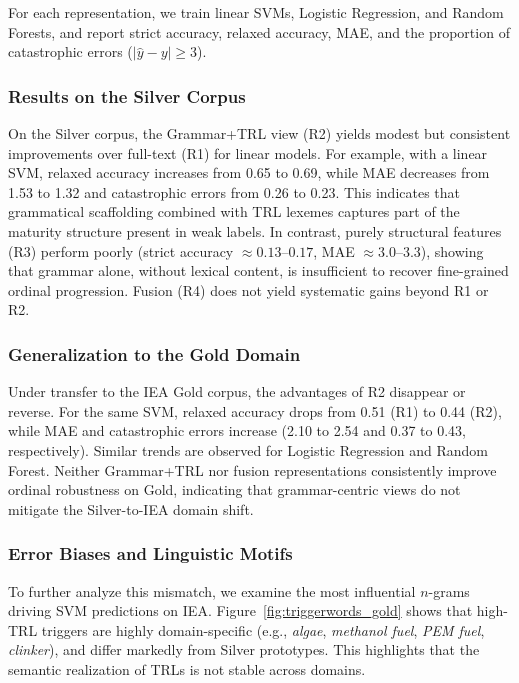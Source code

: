 \documentclass[runningheads]{llncs}
\begin{document}
For each representation, we train linear SVMs, Logistic Regression, and Random
Forests, and report strict accuracy, relaxed accuracy, MAE, and the proportion
of catastrophic errors ($|\hat{y}-y|\ge3$).

\subsubsection{Results on the Silver Corpus}

On the Silver corpus, the Grammar+TRL view (R2) yields modest but consistent improvements over full-text (R1) for linear models. For example, with a linear SVM, relaxed accuracy increases from 0.65 to 0.69, while MAE decreases from 1.53 to 1.32 and catastrophic errors from 0.26 to 0.23. This indicates that grammatical
scaffolding combined with TRL lexemes captures part of the maturity structure present in weak labels. In contrast, purely structural features (R3) perform poorly (strict accuracy
$\approx 0.13$--$0.17$, MAE $\approx 3.0$--$3.3$), showing that grammar alone,
without lexical content, is insufficient to recover fine-grained ordinal
progression. Fusion (R4) does not yield systematic gains beyond R1 or R2.

\subsubsection{Generalization to the Gold Domain}

Under transfer to the IEA Gold corpus, the advantages of R2 disappear or reverse.
For the same SVM, relaxed accuracy drops from 0.51 (R1) to 0.44 (R2), while MAE
and catastrophic errors increase (2.10 to 2.54 and 0.37 to 0.43, respectively).
Similar trends are observed for Logistic Regression and Random Forest. Neither
Grammar+TRL nor fusion representations consistently improve ordinal robustness
on Gold, indicating that grammar-centric views do not mitigate the Silver-to-IEA
domain shift.

\subsubsection{Error Biases and Linguistic Motifs}

To further analyze this mismatch, we examine the most influential $n$-grams
driving SVM predictions on IEA. Figure~\ref{fig:triggerwords_gold} shows that
high-TRL triggers are highly domain-specific (e.g., \emph{algae},
\emph{methanol fuel}, \emph{PEM fuel}, \emph{clinker}), and differ markedly from
Silver prototypes. This highlights that the semantic realization of TRLs is not
stable across domains.
\end{document}
